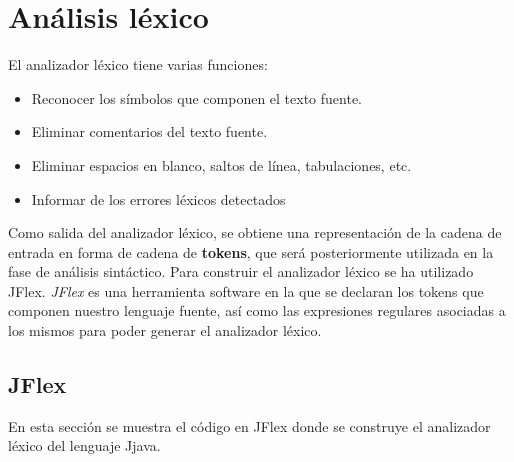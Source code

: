 \documentclass[12pt,a4paper]{article}
\begin{document}
%


\section{Análisis léxico}
El analizador léxico tiene varias funciones:
\begin{itemize}
	\item Reconocer los símbolos que componen el texto fuente.
	\item Eliminar comentarios del texto fuente.
	\item Eliminar espacios en blanco, saltos de línea, tabulaciones, etc.
	\item Informar de los errores léxicos detectados
\end{itemize}

Como salida del analizador léxico, se obtiene una representación de la cadena de entrada en forma de cadena de \textbf{tokens}, que será posteriormente utilizada en la fase de análisis sintáctico. Para construir el analizador léxico se ha utilizado JFlex. 
\newline
\newline
\textit{JFlex} \cite{flex} es una herramienta software en la que se declaran los tokens que componen nuestro lenguaje fuente, así como las expresiones regulares asociadas a los mismos para poder generar el analizador léxico. \newline

\subsection{JFlex}

En esta sección se muestra el código en JFlex donde se construye el analizador léxico del lenguaje Jjava.
\end{document}
